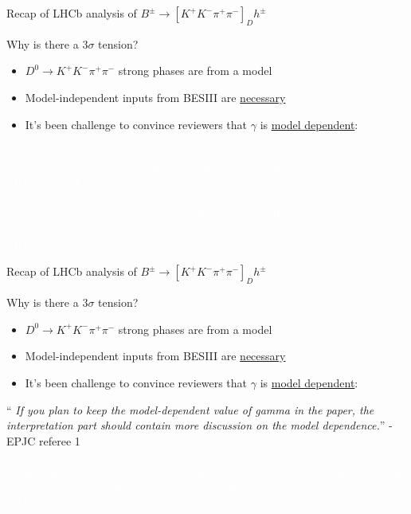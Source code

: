 \documentclass{beamer}
\newcommand{\white}[1]{{\textcolor{white}{#1}}} %
\begin{document}
\begin{frame}{Recap of LHCb analysis of $B^\pm\to[K^+K^-\pi^+\pi^-]_Dh^\pm$}
  \begin{center}
    \Large{Why is there a $3\sigma$ tension?}
  \end{center}
  \begin{itemize}
    \setlength\itemsep{0.3em}
    \item{$D^0\to K^+K^-\pi^+\pi^-$ strong phases are from a model}
    \item{Model-independent inputs from BESIII are \underline{necessary}}
    \item{It's been challenge to convince reviewers that $\gamma$ is \underline{model dependent}:}
  \end{itemize}
  \vspace{0.5cm}
  \white{`` \textit{If you plan to keep the model-dependent value of gamma in the paper, the interpretation part should contain more discussion on the model dependence.}'' - EPJC referee 1} \\~\\
  \white{``\textit{A general comment is that in (7 !!) different places [Abstract, Introduction (page 1)...] it is mentioned the same message: that the analysis is model-dependent...}'' - EPJC referee 2}
\end{frame}

\begin{frame}{Recap of LHCb analysis of $B^\pm\to[K^+K^-\pi^+\pi^-]_Dh^\pm$}
  \begin{center}
    \Large{Why is there a $3\sigma$ tension?}
  \end{center}
  \begin{itemize}
    \setlength\itemsep{0.3em}
    \item{$D^0\to K^+K^-\pi^+\pi^-$ strong phases are from a model}
    \item{Model-independent inputs from BESIII are \underline{necessary}}
    \item{It's been challenge to convince reviewers that $\gamma$ is \underline{model dependent}:}
  \end{itemize}
  \vspace{0.5cm}
  `` \textit{If you plan to keep the model-dependent value of gamma in the paper, the interpretation part should contain more discussion on the model dependence.}'' - EPJC referee 1 \\~\\
  \white{``\textit{A general comment is that in (7 !!) different places [Abstract, Introduction (page 1)...] it is mentioned the same message: that the analysis is model-dependent...}'' - EPJC referee 2}
\end{frame}
\end{document}
